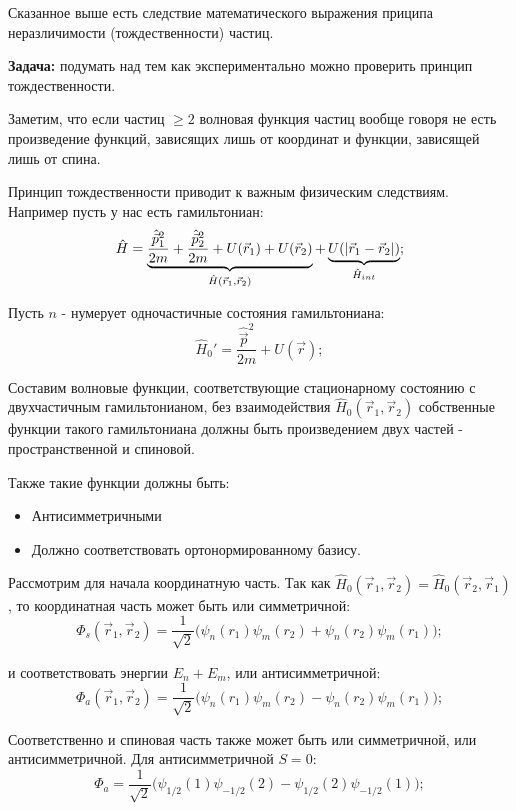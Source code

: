 \documentclass[a4paper, 14pt, russian]{article}
\newcommand{\be}{\begin{equation}}
\newcommand{\ee}{\end{equation}}
\begin{document}
	Сказанное выше есть следствие математического выражения приципа неразличимости 
	(тождественности) частиц.

	\begin{tcolorbox}
		\textbf{Задача:} подумать над тем как экспериментально можно
		проверить принцип тождественности.
	\end{tcolorbox}

	Заметим, что если частиц $\ge 2$ волновая функция частиц
	вообще говоря не есть произведение функций, зависящих лишь от
	координат и функции, зависящей лишь от спина.

	Принцип тождественности приводит к важным физическим следствиям.
	Например пусть у нас есть гамильтониан:
	\be
		\hat H = \underbrace{\frac{\hat{\vec p}_1^2}{2m} + \frac{\hat{\vec p}_2^2}{2m} +
			U(\vec{r}_1) + U(\vec{r}_2)}_{\hat H (\vec{r}_1, \vec{r}_2)} + 
			\underbrace{U(\abs{\vec{r}_1 - \vec{r}_2})}_{\hat{H}_{int}};
	\ee

	Пусть $n$ - нумерует одночастичные состояния гамильтониана:
	\be
		\hat{H}_0' = \frac{\hat{\vec p}^2}{2m} + U(\vec r);
	\ee

	Составим волновые функции, соответствующие стационарному состоянию с 
	двухчастичным гамильтонианом, без взаимодействия $\hat{H}_0(\vec{r}_1,\vec{r}_2)$
	собственные функции такого гамильтониана должны быть произведением двух частей
	- пространственной и спиновой.

	Также такие функции должны быть:
	\begin{itemize}
		\item Антисимметричными
		\item Должно соответствовать ортонормированному базису.
	\end{itemize}

	Рассмотрим для начала координатную часть. Так как 
	$\hat{H}_0(\vec{r}_1,\vec{r}_2) = \hat{H}_0(\vec{r}_2,\vec{r}_1)$,
	то координатная часть может быть или симметричной:
	\be
		\Phi_s(\vec{r}_1,\vec{r}_2) = \frac{1}{\sqrt 2} \big(\psi_n(r_1)\psi_m(r_2) + \psi_n(r_2)\psi_m(r_1)\big);
	\ee

	и соответствовать энергии $E_n + E_m$, или антисимметричной:
	\be
		\Phi_a(\vec{r}_1,\vec{r}_2) = \frac{1}{\sqrt 2} \big(\psi_n(r_1)\psi_m(r_2) - \psi_n(r_2)\psi_m(r_1)\big);
	\ee  

	Соответственно и спиновая часть также может быть или симметричной, или антисимметричной.
	Для антисимметричной $S = 0$:
	\be
		\Phi_{a} = \frac{1}{\sqrt 2} \big(\psi_{1/2} (1) \psi_{-1/2} (2) - \psi_{1/2} (2) \psi_{-1/2} (1)\big);
	\ee
\end{document}

